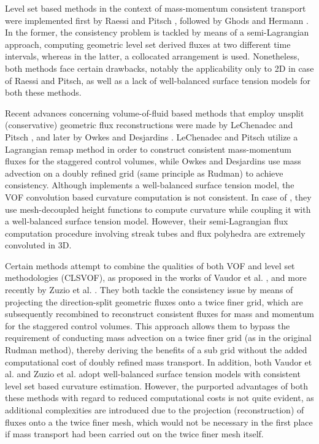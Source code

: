 Level set based methods in the context of mass-momentum consistent 
transport were implemented first by Raessi and Pitsch , 
followed by Ghods and Hermann \cite{ghods2013consistent}. 
In the former, the consistency problem is tackled by means of a 
semi-Lagrangian approach, computing geometric level set derived 
fluxes at two different time intervals, whereas in the latter, 
a collocated arrangement is used. 
Nonetheless, both methods face certain drawbacks, notably the 
applicability only to 2D in case of Raessi and Pitsch, 
as well as a lack of well-balanced surface tension models for both these methods.   


Recent advances concerning volume-of-fluid based methods that 
employ unsplit (conservative) geometric flux reconstructions 
were made by LeChenadec and Pitsch 
, and later by Owkes and Desjardins \cite{owkes2017mass}. 
LeChenadec and Pitsch utilize a Lagrangian remap method in order 
to construct consistent mass-momentum fluxes for the staggered control volumes, 
while Owkes and Desjardins use mass advection on a doubly refined grid 
(same principle as Rudman) to achieve consistency.     
Although \cite{le2013monotonicity} implements a well-balanced surface tension model, 
the VOF convolution based curvature computation is not consistent. 
In case of , they use mesh-decoupled height functions 
to compute curvature while coupling it with a well-balanced surface tension model. 
However, their semi-Lagrangian flux computation procedure 
involving streak tubes and flux polyhedra are extremely convoluted in 3D.     


Certain methods attempt to combine the qualities of both 
VOF and level set methodologies (CLSVOF), as proposed in the works of 
Vaudor et al. , 
and more recently by Zuzio et al. \cite{zuzio2020new}. 
They both tackle the consistency issue by means of projecting 
the direction-split geometric fluxes onto a twice finer grid, 
which are subsequently recombined to reconstruct consistent 
fluxes for mass and momentum for the staggered control volumes. 
This approach allows them to bypass the requirement of conducting 
mass advection on a twice finer grid (as in the original Rudman method), 
thereby deriving the benefits of a sub grid without the 
added computational cost of doubly refined mass transport. 
In addition, both Vaudor et al. \cite{vaudor2017consistent} and 
Zuzio et al.  adopt well-balanced surface tension 
models with consistent level set based curvature estimation. 
However, the purported advantages of both these methods with 
regard to reduced computational costs is not quite evident, 
as additional complexities are introduced due to the projection 
(reconstruction) of fluxes onto a the twice finer mesh, 
which would not be necessary in the first place if mass transport 
had been carried out on the twice finer mesh itself. 


